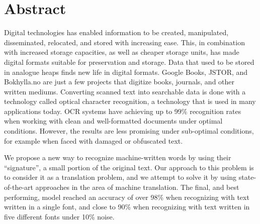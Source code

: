 
\chapter*{Abstract}
Digital technologies has enabled information to be created, manipulated, disseminated, relocated, and stored with increasing ease. This, in combination with increased storage capacities, as well as cheaper storage units, has made digital formats suitable for preservation and storage. Data that used to be stored in analogue heaps finds new life in digital formats. Google Books, JSTOR, and Bokhylla.no are just a few projects that digitize books, journals, and other written mediums. Converting scanned text into searchable data is done with a technology called optical character recognition, a technology that is used in many applications today. OCR systems have achieving up to 99\% recognition rates when working with clean and well-formatted documents under optimal conditions. However, the results are less promising under sub-optimal conditions, for example when faced with damaged or obfuscated text. \newline

\noindent We propose a new way to recognize machine-written words by using their ``signature'', a small portion of the original text. Our approach to this problem is to consider it as a translation problem, and we attempt to solve it by using state-of-the-art approaches in the area of machine translation. The final, and best performing, model reached an accuracy of over 98\% when recognizing with text written in a single font, and close to 90\% when recognizing with text written in five different fonts under 10\% noise.